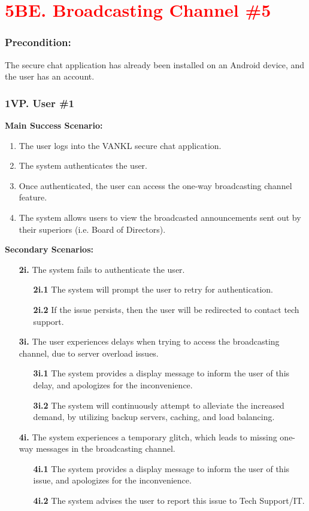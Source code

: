 \documentclass[]{article}
\begin{document}
\section*{\textcolor{red}{5BE. Broadcasting Channel \#5}}
\subsubsection*{Precondition:} The secure chat application has already been installed on an Android device, and the user has an account.
\subsubsection*{1VP. User \#1}
\textbf{Main Success Scenario:}
\begin{enumerate}
	\item The user logs into the VANKL secure chat application.
	\item The system authenticates the user.
	\item Once authenticated, the user can access the one-way broadcasting channel feature.
	\item The system allows users to view the broadcasted announcements sent out by their superiors (i.e. Board of Directors).
\end{enumerate}
\textbf{Secondary Scenarios:}
\begin{enumerate}
	\item[\textbf{2i.}] The system fails to authenticate the user.
		\begin{enumerate}
			\item[\textbf{2i.1}] The system will prompt the user to retry for authentication.
			\item[\textbf{2i.2}] If the issue persists, then the user will be redirected to contact tech support.
		\end{enumerate}
	\item[\textbf{3i.}] The user experiences delays when trying to access the broadcasting channel, due to server overload issues.
		\begin{enumerate}
			\item[\textbf{3i.1}] The system provides a display message to inform the user of this delay, and apologizes for the inconvenience.
			\item[\textbf{3i.2}] The system will continuously attempt to alleviate the increased demand, by utilizing backup servers, caching, and load balancing.
		\end{enumerate}
	\item[\textbf{4i.}] The system experiences a temporary glitch, which leads to missing one-way messages in the broadcasting channel.
		\begin{enumerate}
			\item[\textbf{4i.1}] The system provides a display message to inform the user of this issue, and apologizes for the inconvenience.
			\item[\textbf{4i.2}] The system advises the user to report this issue to Tech Support/IT.
		\end{enumerate}
\end{enumerate}
\end{document}
